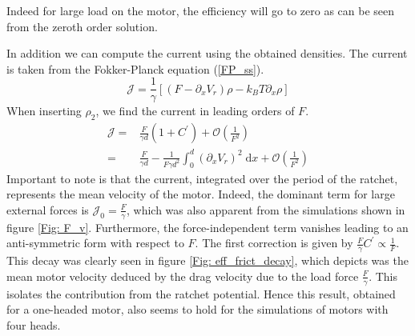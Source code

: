 \documentclass[aps,pre,twocolumn,showpacs,showkeys,a4paper]{revtex4}
\newcommand{\rmd}{{\mathrm d}}
\begin{document}
Indeed for large load on the motor, the efficiency will go to zero as can be seen from the zeroth order solution.
\par
In addition we can compute the current using the obtained densities. 
The current is taken from the Fokker-Planck equation (\ref{FP_ss}).
\begin{equation}
\mathcal{J} = \frac{1}{\gamma} \left[ \left( F - \partial_x V_r \right) \rho - k_B T \partial_x \rho \right] 
\end{equation}
When inserting $\rho_2$, we find the current in leading orders of $F$.
\begin{align*}
\mathcal{J} =& \frac{F}{\gamma d} \left( 1 + C^\prime \right) + \mathcal{O}( \frac{1}{F^2} ) \\
=& \frac{F}{\gamma d} - \frac{1}{F\gamma d^2} \int^d_0 \left( \partial_x V_r \right)^2 \; \rmd x + \mathcal{O}(\frac{1}{F^2}) 
\end{align*}
Important to note is that the current, integrated over the period of the ratchet, represents the mean velocity of the motor. 
Indeed, the dominant term for large external forces is $\mathcal{J}_0 = \frac{F}{\gamma}$, which was also apparent from the simulations shown in figure \ref{Fig: F_v}. 
Furthermore, the force-independent term vanishes leading to an anti-symmetric form with respect to $F$. 
The first correction is given by $\frac{F}{\gamma}C^\prime\propto \frac{1}{F}$. 
This decay was clearly seen in figure \ref{Fig: eff_frict_decay}, which depicts was the mean motor velocity deduced by the drag velocity due to the load force $\frac{F}{\gamma}$. 
This isolates the contribution from the ratchet potential. 
Hence this result, obtained for a one-headed motor, also seems to hold for the simulations of motors with four heads. 
\end{document}
